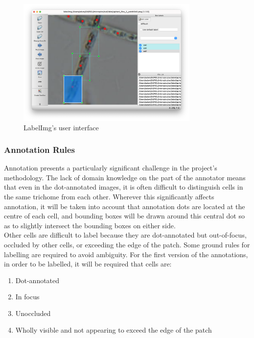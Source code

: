 \begin{figure}[h!]
	\centering
	\includegraphics[width=0.8\textwidth]{images/03Design/labelImg.png}
	\caption{LabelImg's user interface}
    \label{labelImg}
\end{figure}

\subsubsection{Annotation Rules}
Annotation presents a particularly significant challenge in the project's methodology. The lack of domain knowledge on the part of the annotator means that even in the dot-annotated images, it is often difficult to distinguish cells in the same trichome from each other. Wherever this significantly affects annotation, it will be taken into account that annotation dots are located at the centre of each cell, and bounding boxes will be drawn around this central dot so as to slightly intersect the bounding boxes on either side.\\

Other cells are difficult to label because they are dot-annotated but out-of-focus, occluded by other cells, or exceeding the edge of the patch. Some ground rules for labelling are required to avoid ambiguity. For the first version of the annotations, in order to be labelled, it will be required that cells are:

\begin{enumerate}
    \item Dot-annotated
    \item In focus
    \item Unoccluded
    \item Wholly visible and not appearing to exceed the edge of the patch
\end{enumerate}

